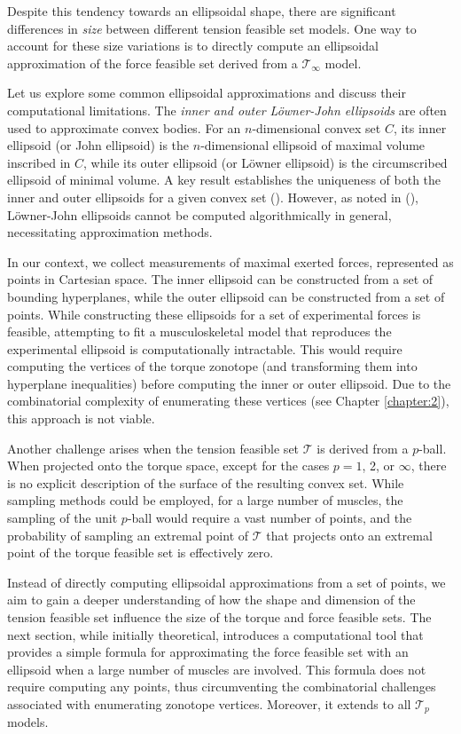 Despite this tendency towards an ellipsoidal shape, there are significant differences in \emph{size} between different tension feasible set models. One way to account for these size variations is to directly compute an ellipsoidal approximation of the force feasible set derived from a $\mathcal{T}_{\infty}$ model.

Let us explore some common ellipsoidal approximations and discuss their computational limitations. The \emph{inner and outer Löwner-John ellipsoids} are often used to approximate convex bodies. For an $n$-dimensional convex set $C$, its inner ellipsoid (or John ellipsoid) is the $n$-dimensional ellipsoid of maximal volume inscribed in $C$, while its outer ellipsoid (or Löwner ellipsoid) is the circumscribed ellipsoid of minimal volume.  A key result establishes the uniqueness of both the inner and outer ellipsoids for a given convex set (\cite{henkLownerJohnEllipsoids2012}). However, as noted in (\cite{cernyGoffinAlgorithmZonotopes2012}), Löwner-John ellipsoids cannot be computed algorithmically in general, necessitating approximation methods.

In our context, we collect measurements of maximal exerted forces, represented as points in Cartesian space. The inner ellipsoid can be constructed from a set of bounding hyperplanes, while the outer ellipsoid can be constructed from a set of points.  While constructing these ellipsoids for a set of experimental forces is feasible, attempting to fit a musculoskeletal model that reproduces the experimental ellipsoid is computationally intractable. This would require computing the vertices of the torque zonotope (and transforming them into hyperplane inequalities) before computing the inner or outer ellipsoid. Due to the combinatorial complexity of enumerating these vertices (see Chapter \ref{chapter:2}), this approach is not viable.

Another challenge arises when the tension feasible set $\mathcal{T}$ is derived from a $p$-ball. When projected onto the torque space, except for the cases $p = 1$, 2, or $\infty$, there is no explicit description of the surface of the resulting convex set. While sampling methods could be employed, for a large number of muscles, the sampling of the unit $p$-ball would require a vast number of points, and the probability of sampling an extremal point of $\mathcal{T}$ that projects onto an extremal point of the torque feasible set is effectively zero.

Instead of directly computing ellipsoidal approximations from a set of points, we aim to gain a deeper understanding of how the shape and dimension of the tension feasible set influence the size of the torque and force feasible sets. The next section, while initially theoretical, introduces a computational tool that provides a simple formula for approximating the force feasible set with an ellipsoid when a large number of muscles are involved. This formula does not require computing any points, thus circumventing the combinatorial challenges associated with enumerating zonotope vertices. Moreover, it extends to all $\mathcal{T}_p$ models.

